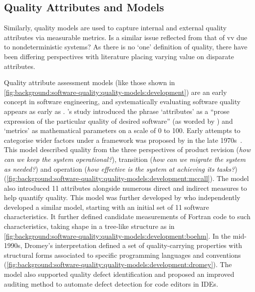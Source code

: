 \subsection{Quality Attributes and Models}
\label{ssec:background:software-quality:quality-models}

Similarly, quality models are used to capture internal and external quality attributes via measurable metrics. Is a similar issue reflected from that of \gls{vv} due to nondeterministic systems? As there is no `one' definition of quality, there have been differing perspectives with literature placing varying value on disparate attributes.



Quality attribute assessment models (like those shown in \cref{fig:background:software-quality:quality-models:development}) are an early concept in software engineering, and systematically evaluating software quality appears as early as \citeyear{Rubey:1968fg} \citep{Rubey:1968fg}. \citeauthor{Rubey:1968fg}'s \citeyear{Rubey:1968fg} study introduced the phrase `attributes' as a ``prose expression of the particular quality of desired software'' (as worded by \citet{Boehm:1978vv}) and `metrics' as mathematical parameters on a scale of 0 to 100. 
Early attempts to categorise wider factors under a framework was proposed by \citeauthor*{McCall:1977uy} in the late 1970s~\citep{McCall:1977uy,Cavano:1978gz}. This model described quality from the three perspectives of product revision (\textit{how can we keep the system operational?}), transition (\textit{how can we migrate the system as needed?}) and operation (\textit{how effective is the system at achieving its tasks?}) (\cref{fig:background:software-quality:quality-models:development:mccall}). The model also introduced 11 attributes alongside numerous direct and indirect measures to help quantify quality.
This model was further developed by \citet{Boehm:1978vv} who independently developed a similar model, starting with an initial set of 11 software characteristics. It further defined candidate measurements of Fortran code to such characteristics, taking shape in a tree-like structure as in \cref{fig:background:software-quality:quality-models:development:boehm}. 
In the mid-1990s, Dromey's interpretation \citep{Dromey:1995wy} defined a set of quality-carrying properties with structural forms associated to specific programming languages and conventions (\cref{fig:background:software-quality:quality-models:development:dromey}). The model also supported quality defect identification and proposed an improved auditing method to automate defect detection for code editors in IDEs. 
